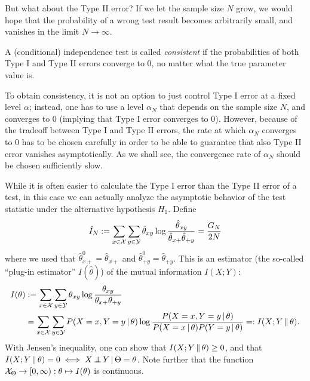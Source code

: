 But what about the Type II error? 
If we let the sample size $N$ grow, we would hope that the probability of a wrong test result becomes arbitrarily small, and
vanishes in the limit $N \to \infty$. 
\begin{Def}\label{def:consistency_ci_test}
A (conditional) independence test is called \emph{consistent} if the probabilities of both Type I and Type II errors converge to 0, no matter what the true parameter value is.
\end{Def}
To obtain consistency, it is not an option to just control Type I error at a fixed level $\alpha$; instead, one has to use a level $\alpha_N$
that depends on the sample size $N$, and converges to 0 (implying that Type I error converges to 0). However, because of the
tradeoff between Type I and Type II errors, the rate at which $\alpha_N$ converges to $0$ has to be chosen carefully in order to
be able to guarantee that also Type II error vanishes asymptotically. As we shall see, the convergence rate of $\alpha_N$ should be chosen
sufficiently slow.

While it is often easier to calculate the Type I error than the Type II error of
a test, in this case we can actually analyze the asymptotic behavior of the test statistic under the alternative hypothesis $H_1$.
Define
$$\hat I_N := \sum_{x\in\mathcal{X}} \sum_{y\in\mathcal{Y}} \hat \theta_{xy} \log \frac{\hat \theta_{xy}}{\hat \theta_{x+} \hat \theta_{+ y}}
    = \frac{G_N}{2N}$$
where we used that $\hat\theta^0_{x +} = \hat\theta_{x +}$ and $\hat\theta^0_{+ y} = \hat\theta_{+ y}$.
This is an estimator (the so-called ``plug-in estimator'' $I(\hat\theta)$) of the mutual information $I(X;Y)$:
\begin{equation*}\begin{split}
  I(\theta) & := \sum_{x\in\mathcal{X}}\sum_{y\in\mathcal{Y}} \theta_{xy} \log \frac{\theta_{xy}}{\theta_{x +} \theta_{+ y}} \\
  & = \sum_{x\in\mathcal{X}} \sum_{y\in\mathcal{Y}} P(X=x,Y=y \operatorname*{|} \theta) \log \frac{P(X=x,Y=y \operatorname*{|} \theta)}{P(X=x \operatorname*{|} \theta) P(Y=y \operatorname*{|} \theta)} =: I(X;Y \operatorname*{\Vert} \theta).
\end{split}\end{equation*}
With Jensen's inequality, one can show that $I(X;Y \operatorname*{\Vert} \theta) \ge 0$, and that $I(X;Y \operatorname*{\Vert} \theta) = 0 \iff X \operatorname*{\perp\mkern-11mu\perp} Y \operatorname*{|} \Theta=\theta$.
Note further that the function $\mathcal{X}_\Theta \to [0,\infty) : \theta \mapsto I(\theta)$ is continuous.

